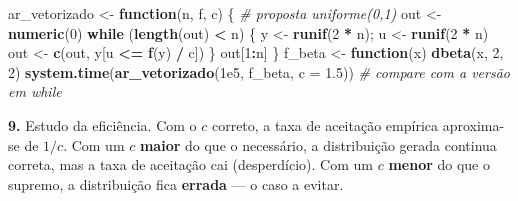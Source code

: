 \documentclass[
  portuguese,
  11pt,
  openany]{book}
\newenvironment{Shaded}{\begin{snugshade}}{\end{snugshade}}
\newcommand{\AttributeTok}[1]{\textcolor[rgb]{0.13,0.29,0.53}{#1}}
\newcommand{\CommentTok}[1]{\textcolor[rgb]{0.56,0.35,0.01}{\textit{#1}}}
\newcommand{\ControlFlowTok}[1]{\textcolor[rgb]{0.13,0.29,0.53}{\textbf{#1}}}
\newcommand{\DecValTok}[1]{\textcolor[rgb]{0.00,0.00,0.81}{#1}}
\newcommand{\FloatTok}[1]{\textcolor[rgb]{0.00,0.00,0.81}{#1}}
\newcommand{\FunctionTok}[1]{\textcolor[rgb]{0.13,0.29,0.53}{\textbf{#1}}}
\newcommand{\NormalTok}[1]{#1}
\newcommand{\OtherTok}[1]{\textcolor[rgb]{0.56,0.35,0.01}{#1}}
\newcommand{\SpecialCharTok}[1]{\textcolor[rgb]{0.81,0.36,0.00}{\textbf{#1}}}
\begin{document}
\begin{Shaded}
\begin{Highlighting}[]
\NormalTok{ar\_vetorizado }\OtherTok{\textless{}{-}} \ControlFlowTok{function}\NormalTok{(n, f, c) \{           }\CommentTok{\# proposta uniforme(0,1)}
\NormalTok{  out }\OtherTok{\textless{}{-}} \FunctionTok{numeric}\NormalTok{(}\DecValTok{0}\NormalTok{)}
  \ControlFlowTok{while}\NormalTok{ (}\FunctionTok{length}\NormalTok{(out) }\SpecialCharTok{\textless{}}\NormalTok{ n) \{}
\NormalTok{    y }\OtherTok{\textless{}{-}} \FunctionTok{runif}\NormalTok{(}\DecValTok{2} \SpecialCharTok{*}\NormalTok{ n); u }\OtherTok{\textless{}{-}} \FunctionTok{runif}\NormalTok{(}\DecValTok{2} \SpecialCharTok{*}\NormalTok{ n)}
\NormalTok{    out }\OtherTok{\textless{}{-}} \FunctionTok{c}\NormalTok{(out, y[u }\SpecialCharTok{\textless{}=} \FunctionTok{f}\NormalTok{(y) }\SpecialCharTok{/}\NormalTok{ c])}
\NormalTok{  \}}
\NormalTok{  out[}\DecValTok{1}\SpecialCharTok{:}\NormalTok{n]}
\NormalTok{\}}
\NormalTok{f\_beta }\OtherTok{\textless{}{-}} \ControlFlowTok{function}\NormalTok{(x) }\FunctionTok{dbeta}\NormalTok{(x, }\DecValTok{2}\NormalTok{, }\DecValTok{2}\NormalTok{)}
\FunctionTok{system.time}\NormalTok{(}\FunctionTok{ar\_vetorizado}\NormalTok{(}\FloatTok{1e5}\NormalTok{, f\_beta, }\AttributeTok{c =} \FloatTok{1.5}\NormalTok{))   }\CommentTok{\# compare com a versão em while}
\end{Highlighting}
\end{Shaded}

\textbf{9.} Estudo da eficiência. Com o \(c\) correto, a taxa de aceitação empírica
aproxima-se de \(1/c\). Com um \(c\) \textbf{maior} do que o necessário, a distribuição
gerada continua correta, mas a taxa de aceitação cai (desperdício). Com um \(c\)
\textbf{menor} do que o supremo, a distribuição fica \textbf{errada} --- o caso a evitar.
\end{document}
